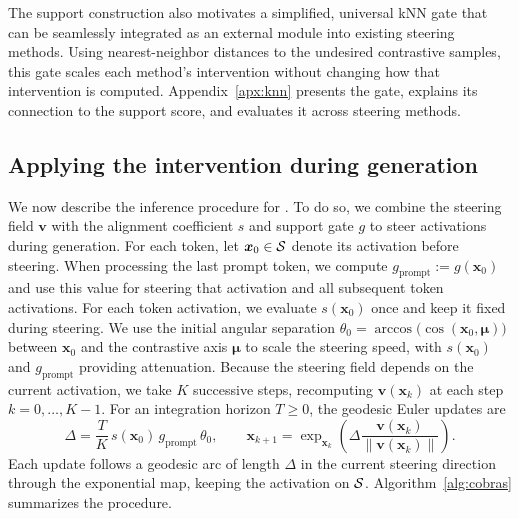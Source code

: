 \begin{remark}
The support construction also motivates a simplified, universal kNN gate that can be seamlessly integrated as an external module into existing steering methods. Using nearest-neighbor distances to the undesired contrastive samples, this gate scales each method's intervention without changing how that intervention is computed. Appendix~\ref{apx:knn} presents the gate, explains its connection to the support score, and evaluates it across steering methods.\end{remark}

\subsection{Applying the intervention during generation}
\label{subsec:procedure}

We now describe the inference procedure for \Cobras. To do so, we combine the steering field $\boldsymbol{v}$ with the alignment coefficient $s$ and support gate $g$ to steer activations during generation. For each token, let $\boldsymbol{x}_0\in\mathcal{S}$ denote its activation before steering. When processing the last prompt token, we compute $g_{\mathrm{prompt}}:=g(\boldsymbol{x}_0)$ and use this value for steering that activation and all subsequent token activations. For each token activation, we evaluate $s(\boldsymbol{x}_0)$ once and keep it fixed during steering. We use the initial angular separation $\theta_0=\arccos\bigl(\cos(\boldsymbol{x}_0,\boldsymbol{\mu})\bigr)$ between $\boldsymbol{x}_0$ and the contrastive axis $\boldsymbol{\mu}$ to scale the steering speed, with $s(\boldsymbol{x}_0)$ and $g_{\mathrm{prompt}}$ providing attenuation. Because the steering field depends on the current activation, we take $K$ successive steps, recomputing $\boldsymbol{v}(\boldsymbol{x}_k)$ at each step $k=0,\ldots,K-1$. For an integration horizon $T\ge0$, the geodesic Euler updates are
\begin{equation}
\displaystyle
\Delta=\frac{T}{K}\,s(\boldsymbol{x}_0)\,g_{\mathrm{prompt}}\,\theta_0,
\qquad
\boldsymbol{x}_{k+1}
=\exp_{\boldsymbol{x}_k}\!\left(
\Delta\frac{\boldsymbol{v}(\boldsymbol{x}_k)}{\|\boldsymbol{v}(\boldsymbol{x}_k)\|}
\right).
\label{eq:step}
\end{equation}
Each update follows a geodesic arc of length $\Delta$ in the current steering direction through the exponential map, keeping the activation on $\mathcal{S}$. Algorithm~\ref{alg:cobras} summarizes the procedure.

